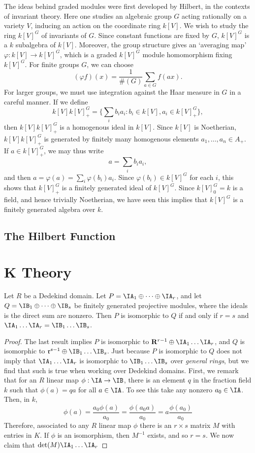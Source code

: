 The ideas behind graded modules were first developed by Hilbert, in the contexts of invariant theory. Here one studies an algebraic group $G$ acting rationally on a variety $V$, inducing an action on the coordinate ring $k[V]$. We wish to study the ring $k[V]^G$ of invariants of $G$. Since constant functions are fixed by $G$, $k[V]^G$ is a $k$ subalgebra of $k[V]$. Moreover, the group structure gives an `averaging map' $\varphi: k[V] \to k[V]^G$, which is a graded $k[V]^G$ module homomorphism fixing $k[V]^G$. For finite groups $G$, we can choose
%
\[ (\varphi f)(x) = \frac{1}{\#(G)} \sum_{a \in G} f(ax). \]
%
For larger groups, we must use integration against the Haar measure in $G$ in a careful manner. If we define
%
\[ k[V] k[V]^G_+ = \{ \sum_i b_ia_i: b_i \in k[V], a_i \in k[V]^G_+ \}, \]
%
then $k[V] k[V]^G_+$ is a homogenous ideal in $k[V]$. Since $k[V]$ is Noetherian, $k[V] k[V]^G_+$ is generated by finitely many homogenous elements $a_1, \dots, a_n \in A_+$. If $a \in k[V]^G_+$, we may thus write
%
\[ a = \sum_i b_i a_i, \]
%
and then $a = \varphi(a) = \sum_i \varphi(b_i) a_i$. Since $\varphi(b_i) \in k[V]^G$ for each $i$, this shows that $k[V]^G_+$ is a finitely generated ideal of $k[V]^G$. Since $k[V]^G_0 = k$ is a field, and hence trivially Noetherian, we have seen this implies that $k[V]^G$ is a finitely generated algebra over $k$.

\section{The Hilbert Function}

\chapter{K Theory}

\begin{theorem}[Steinitz]
    Let $R$ be a Dedekind domain. Let $P = \IA_1 \oplus \dots \oplus \IA_r$, and let $Q = \IB_1 \oplus \dots \oplus \IB_s$ be finitely generated projective modules, where the ideals is the direct sum are nonzero. Then $P$ is isomorphic to $Q$ if and only if $r = s$ and $\IA_1 \dots \IA_r = \IB_1 \dots \IB_s$.
\end{theorem}
\begin{proof}
    The last result implies $P$ is isomorphic to $\mathbf{R}^{r-1} \oplus \IA_1 \dots \IA_r$, and $Q$ is isomorphic to $\mathfrak{r}^{s-1} \oplus \IB_1 \dots \IB_s$. Just because $P$ is isomorphic to $Q$ does not imply that $\IA_1 \dots \IA_r$ is isomorphic to $\IB_1 \dots \IB_s$ over {\it general rings}, but we find that such is true when working over Dedekind domains. First, we remark that for an $R$ linear map $\phi: \IA \to \IB$, there is an element $q$ in the fraction field $k$ such that $\phi(a) = qa$ for all $a \in \IA$. To see this take any nonzero $a_0 \in \IA$. Then, in $k$,
    \[ \phi(a) = \frac{a_0 \phi(a)}{a_0} = \frac{\phi(a_0 a)}{a_0} = a \frac{\phi(a_0)}{a_0} \]
    Therefore, associated to any $R$ linear map $\phi$ there is an $r \times s$ matrix $M$ with entries in $K$. If $\phi$ is an isomorphism, then $M^{-1}$ exists, and so $r = s$. We now claim that $\det(M) \IA_1 \dots \IA_r$
\end{proof}

